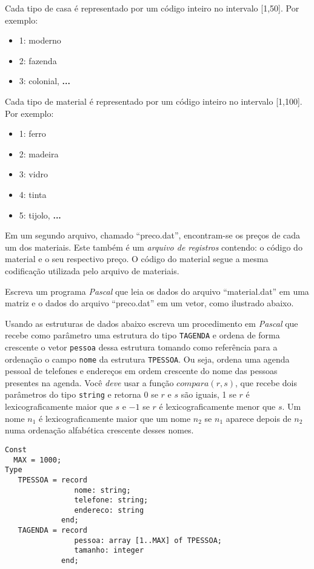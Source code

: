 Cada tipo de casa é representado por um código inteiro no intervalo [1,50].
Por exemplo:  
\begin{itemize}
\item 1: moderno
\item 2: fazenda
\item 3: colonial, {\bf ...}
\end{itemize}

Cada tipo de material é representado por um código inteiro no intervalo
[1,100].  Por exemplo: 
\begin{itemize}
\item 1: ferro
\item 2: madeira
\item 3: vidro
\item 4: tinta
\item 5: tijolo, {\bf ...}
\end{itemize}

Em um segundo arquivo, chamado ``preco.dat'', encontram-se os
preços de cada um dos materiais.
Este também é um {\em arquivo de registros} contendo: o código do material
e o seu 
respectivo preço.   O código do material segue a mesma codificação
utilizada pelo arquivo de materiais.

Escreva um programa \emph{Pascal} que leia os dados do arquivo ``material.dat'' em
uma matriz e o dados do arquivo ``preco.dat'' em um vetor, como ilustrado
abaixo.

\item Usando as estruturas de dados abaixo escreva um procedimento em
\emph{Pascal} que recebe como parâmetro uma estrutura do tipo 
\verb+TAGENDA+ e ordena de forma crescente o vetor \verb+pessoa+ 
dessa estrutura tomando como referência para a ordenação  
o campo \verb+nome+ da estrutura \verb+TPESSOA+. Ou seja,
ordena uma agenda pessoal de telefones e endereços em ordem 
crescente do nome das pessoas presentes na agenda.
Você \emph{deve} usar a função $compara( r, s )$, que recebe dois 
parâmetros do tipo \verb+string+ e retorna 0 se $r$ e $s$ são
iguais, 1 se $r$ é lexicograficamente maior que $s$ e $-1$ 
se $r$ é lexicograficamente menor que $s$. Um nome $n_1$ é 
lexicograficamente maior que um nome $n_2$ se $n_1$ aparece 
depois de $n_2$ numa ordenação alfabética crescente desses
nomes.
\begin{center}
\begin{small}
\begin{verbatim}
Const
  MAX = 1000;
Type
   TPESSOA = record
                nome: string;
                telefone: string;
                endereco: string
             end; 
   TAGENDA = record
                pessoa: array [1..MAX] of TPESSOA;
                tamanho: integer
             end;
\end{verbatim}
\end{small}
\end{center}

